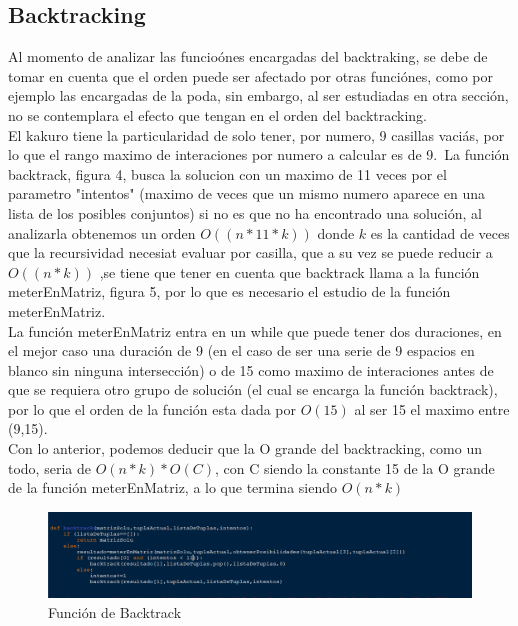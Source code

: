 \documentclass[journal]{IEEEtran}
\begin{document}
\subsection{Backtracking}
Al momento de analizar las funcio\'{o}nes encargadas del backtraking, se debe de tomar en cuenta que el orden puede ser afectado por otras funci\'{o}nes, como por ejemplo las encargadas de la poda, sin embargo, al ser estudiadas en otra secci\'{o}n, no se contemplara el efecto que tengan en el orden del backtracking.\\
El kakuro tiene la particularidad de solo tener, por numero, 9 casillas vaci\'{a}s, por lo que el rango maximo de interaciones por numero a calcular es de 9.\ La funci\'{o}n backtrack, figura 4, busca la solucion con un maximo de 11 veces por el parametro "intentos" (maximo de veces que un mismo numero aparece en una lista de los posibles conjuntos) si no es que no ha encontrado una soluci\'{o}n, al analizarla obtenemos un orden $O((n*{11}*k))$ donde $k$ es la cantidad de veces que la recursividad necesiat evaluar por casilla, que a su vez se puede reducir a  $O((n*k))$ ,se tiene que tener en cuenta que backtrack llama a la funci\'{o}n meterEnMatriz, figura 5, por lo que es necesario el estudio de la funci\'{o}n meterEnMatriz.
\\
La funci\'{o}n meterEnMatriz entra en un while que puede tener dos duraciones, en el mejor caso una duraci\'{o}n de 9 (en el caso de ser una serie de 9 espacios en blanco sin ninguna intersecci\'{o}n) o de 15 como maximo de interaciones antes de que se requiera otro grupo de soluci\'{o}n (el cual se encarga la funci\'{o}n backtrack), por lo que el orden de la funci\'{o}n esta dada por $O(15)$ al ser 15 el maximo entre (9,15).\\ Con lo anterior, podemos deducir que la O grande del backtracking, como un todo, seria de $O(n*k)*O(C)$, con C siendo la constante 15 de la O grande de la funci\'{o}n meterEnMatriz, a lo que termina siendo $O(n*k)$
\begin{figure}[h] 
	\centering \includegraphics[width=1\columnwidth]{backtrack_parte1.png}
	\caption{
		\label{fig:samplesetup}
		Función de Backtrack
	}
\end{figure}
\end{document}

